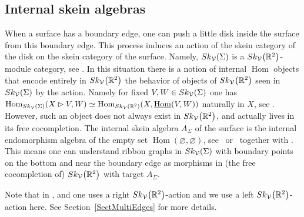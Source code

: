 \documentclass[11pt]{article}
\numberwithin{equation}{section}
\numberwithin{equation}{section}
\newcommand{\Hom}{\operatorname{Hom}}
\begin{document}
\setcounter{Theorem}{38}\setcounter{subsection}{3}
\subsection{Internal skein algebras}\label{SectASigma}
When a surface has a boundary edge, one can push a little disk inside the surface from this boundary edge. This process induces an action of the skein category of the disk on the skein category of the surface. Namely, ${\rm Sk}_\mathcal{V}(\Sigma)$ is a ${\rm Sk}_\mathcal{V}\big(\mathbb{R}^2\big)$-module category, see \cite[Sections~3.2]{Cooke}. In this situation there is a notion of internal $\Hom$ objects that encode entirely in ${\rm Sk}_\mathcal{V}\big(\mathbb{R}^2\big)$ the behavior of objects of ${\rm Sk}_\mathcal{V}\big(\mathbb{R}^2\big)$ seen in ${\rm Sk}_\mathcal{V}(\Sigma)$ by the action. Namely for fixed $V,W \in {\rm Sk}_\mathcal{V}(\Sigma)$ one has $\Hom_{{\rm Sk}_\mathcal{V}(\Sigma)}(X \rhd V,W) \simeq \Hom_{{\rm Sk}_\mathcal{V}(\mathbb{R}^2)}(X, \underline{\Hom}(V,W))$ naturally in $X$, see \cite[Section~7.9]{EGNO}. However, such an object does not always exist in ${\rm Sk}_\mathcal{V}\big(\mathbb{R}^2\big)$, and actually lives in its free cocompletion. The internal skein algebra $A_\Sigma$ of the surface is the internal endomorphism algebra of the empty set $\underline{\Hom}(\varnothing,\varnothing)$, see~\cite{Gunningham} or~\cite{BBJ} together with \cite{Cooke}. This means one can understand ribbon graphs in ${\rm Sk}_\mathcal{V}(\Sigma)$ with boundary points on the bottom and near the boundary edge as morphisms in (the free cocompletion of) ${\rm Sk}_\mathcal{V}\big(\mathbb{R}^2\big)$ with target $A_\Sigma$.

Note that in \cite{Cooke}, \cite{BBJ} and \cite{Gunningham} one uses a right ${\rm Sk}_\mathcal{V}\big(\mathbb{R}^2\big)$-action and we use a left ${\rm Sk}_\mathcal{V}\big(\mathbb{R}^2\big)$-action here. See Section~\ref{SectMultiEdges} for more details.
\end{document}
